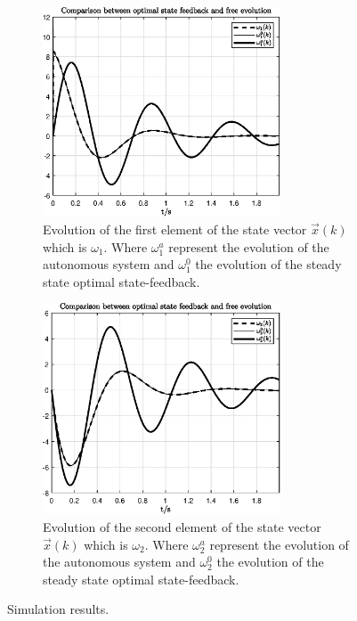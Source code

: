 \documentclass[11pt,a4paper,oneside]{book}
\numberwithin{equation}{section}
\theoremstyle{it}
\theoremstyle{definition}
\begin{document}
\begin{figure}[H]
	\centering
	\begin{subfigure}{.5\textwidth}
		\centering
		\includegraphics[width = 200pt, 
		keepaspectratio]{figures/optimal_control/state12.eps}
		\captionsetup{width=0.65\textwidth, font=footnotesize}
		\caption{Evolution of the first element of the state vector 
			$\vec{x}(k)$ which is $\omega_1$. Where $\omega_1^a$ represent the 
			evolution of the autonomous system and $\omega_1^0$ the evolution of 
			the steady state optimal state-feedback.}
		\label{figure_msm_opt_state_f_12}
	\end{subfigure}%
	\begin{subfigure}{.5\textwidth}
		\centering
		\includegraphics[width = 200pt, 
		keepaspectratio]{figures/optimal_control/state22.eps}
		\captionsetup{width=0.65\textwidth, font=footnotesize}
		\caption{Evolution of the second element of the state vector 
			$\vec{x}(k)$ which is $\omega_2$. Where $\omega_2^a$ represent the 
			evolution of the autonomous system and $\omega_2^0$ the evolution of 
			the steady state optimal state-feedback.}
		\label{figure_msm_opt_state_f_22}
	\end{subfigure}
	\captionsetup{width=0.5\textwidth, font=small}
	\caption{Simulation results.}
	\label{}
\end{figure}
\end{document}
